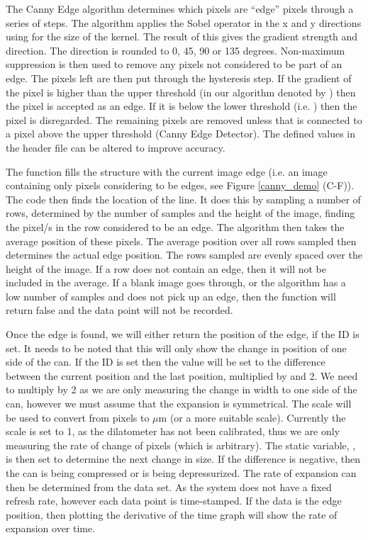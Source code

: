 The Canny Edge algorithm\cite{OpenCV_Canny} determines which pixels are ``edge'' pixels through a series of steps.  The algorithm applies the Sobel operator in the x and y directions using  for the size of the kernel.  The result of this gives the gradient strength and direction. The direction is rounded to 0, 45, 90 or 135 degrees. Non-maximum suppression is then used to remove any pixels not considered to be part of an edge.  The pixels left are then put through the hysteresis step.  If the gradient of the pixel is higher than the upper threshold (in our algorithm denoted by ) then the pixel is accepted as an edge.  If it is below the lower threshold (i.e. ) then the pixel is disregarded.  The remaining pixels are removed unless that is connected to a pixel above the upper threshold (Canny Edge Detector). The defined values in the header file can be altered to improve accuracy.

The  function fills the   structure with the current image edge (i.e. an image containing only pixels considering to be edges, see Figure \ref{canny_demo} (C-F)). The code then finds the location of the line.  It does this by sampling a number of rows, determined by the number of samples and the height of the image, finding the pixel/s in the row considered to be an edge.  The algorithm then takes the average position of these pixels.  The average position over all rows sampled then determines the actual edge position.  The rows sampled are evenly spaced over the height of the image.  If a row does not contain an edge, then it will not be included in the average.  If a blank image goes through, or the algorithm has a low number of samples and does not pick up an edge, then the function will return false and the data point will not be recorded.

Once the edge is found, we will either return the position of the edge, if the  ID is set. It needs to be noted that this will only show the change in position of one side of the can.  If the  ID is set then the value will be set to the difference between the current position and the last position, multiplied by  and 2.  We need to multiply by 2 as we are only measuring the change in width to one side of the can, however we must assume that the expansion is symmetrical.  The scale will be used to convert from pixels to $\mu$m (or a more suitable scale).  Currently the scale is set to 1, as the dilatometer has not been calibrated, thus we are only measuring the rate of change of pixels (which is arbitrary). The static variable, , is then set to determine the next change in size.  If the difference is negative, then the can is being compressed or is being depressurized. 
The rate of expansion can then be determined from the data set.  As the system does not have a fixed refresh rate, however each data point is time-stamped.  If the data is the edge position, then plotting the derivative of the time graph will show the rate of expansion over time.

